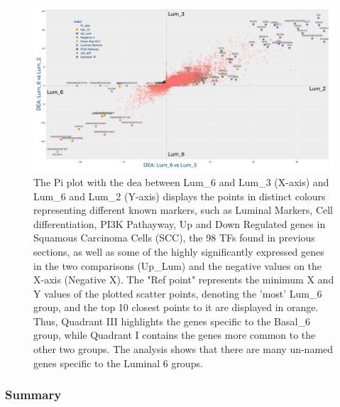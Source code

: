 \begin{figure}[H]    
    \centering
    \includegraphics[width=1.0\textwidth,height=1.0\textheight,keepaspectratio]{Sections/Network_II/resources/reward/PI_Lum_6.png}
    \caption{The Pi plot with the \acrfull{dea} between Lum\_6 and Lum\_3 (X-axis) and Lum\_6 and Lum\_2 (Y-axis) displays the points in distinct colours representing different known markers, such as Luminal Markers, Cell differentiation, PI3K Pathayway, Up and Down Regulated genes in Squamous Carcinoma Cells (SCC), the 98 TFs found in previous sections, as well as some of the highly significantly expressed genes in the two comparisons (Up\_Lum) and the negative values on the X-axis (Negative X). The "Ref point" represents the minimum X and Y values of the plotted scatter points, denoting the 'most' Lum\_6 group, and the top 10 closest points to it are displayed in orange. Thus, Quadrant III highlights the genes specific to the Basal\_6 group, while Quadrant I contains the genes more common to the other two groups. The analysis shows that there are many un-named genes specific to the Luminal 6 groups.}
    \label{fig:N_II:pi_lum_6}
\end{figure}


\subsubsection{Summary}


